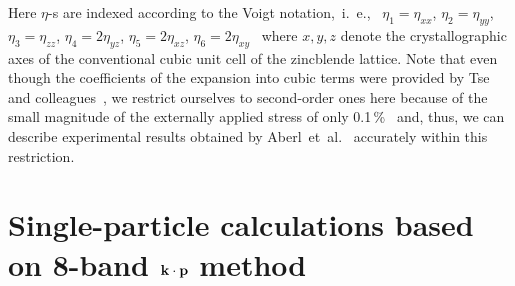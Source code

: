 %
%
Here $\eta$-s are indexed according to the Voigt notation,~i.~e.,~ $\eta_1=\eta_{xx}$, $\eta_2=\eta_{yy}$, $\eta_3=\eta_{zz}$, $\eta_4=2\eta_{yz}$, $\eta_5=2\eta_{xz}$, $\eta_6=2\eta_{xy}$~\cite{Beya-Wakata2011} where $x,y,z$ denote the crystallographic axes of the conventional cubic unit cell of the zincblende lattice.
%
%
Note that even though the coefficients of the expansion into cubic
terms were provided by Tse and colleagues~\cite{Tse2013}, we restrict ourselves to second-order ones here because of the small magnitude of the externally applied stress of only 0.1$\,$\%~\cite{Aberl:17} and, thus, we can describe experimental results obtained by Aberl~et~al.~\cite{Aberl:17} accurately within this restriction. 


\section{Single-particle calculations based on 8-band $\bf{k \cdot p}$ method}




%


